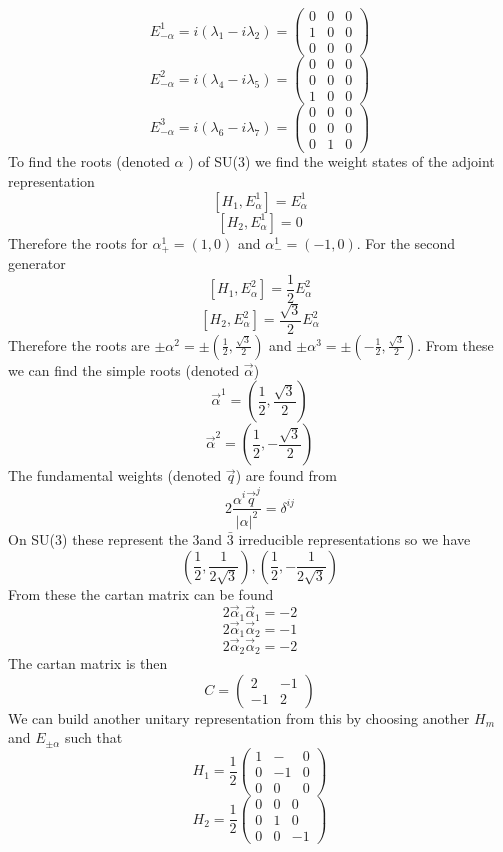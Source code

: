 \documentclass[12pt]{article}
\begin{document}
$$ E^1_{- \alpha} = i(\lambda_1 - i \lambda_2 ) = \begin{pmatrix}
  0&0&0 \\ 1&0&0 \\ 0&0&0 
\end{pmatrix} $$
$$ E^2_{- \alpha} = i(\lambda_4 - i \lambda_5 ) = \begin{pmatrix}
  0&0&0 \\ 0&0&0 \\ 1&0&0 
\end{pmatrix} $$
$$ E^3_{- \alpha} = i(\lambda_6 - i \lambda_7 ) = \begin{pmatrix}
  0&0&0 \\ 0&0&0 \\ 0&1&0 
\end{pmatrix} $$
To find the roots (denoted $\alpha$ ) of SU(3) we find the weight states of the adjoint representation 
$$ [ H_1, E^1_{\alpha} ] = E^1_{\alpha} $$
$$ [H_2, E^1_{\alpha}] = 0 $$
Therefore the roots for $\alpha^1_+ = (1,0)$ and $\alpha_-^1 = (-1,0) $. For the second generator 
$$ [H_1, E_{\alpha}^2] = \frac{1}{2} E^2_{\alpha} $$
$$ [H_2, E_{\alpha}^2 ] = \frac{\sqrt{3}}{2} E^2_{\alpha} $$
Therefore the roots are $\pm \alpha^2 = \pm (\frac{1}{2}, \frac{\sqrt{3}}{2} ) $ and $\pm \alpha^3 = \pm (- \frac{1}{2}, \frac{\sqrt{3}}{2})$. From these we can find the simple roots (denoted $\vec{\alpha}$) 
$$ \vec{\alpha}^1 = (\frac{1}{2}, \frac{\sqrt{3}}{2} ) $$
$$ \vec{\alpha}^2 = (\frac{1}{2}, - \frac{\sqrt{3}}{2} ) $$
The fundamental weights (denoted $\vec{q}$) are found from 
$$ 2 \frac{\alpha^i \vec{q}^j}{|\alpha|^2} = \delta^{ij}  $$
On SU(3) these represent the $3$and $\bar{3}$ irreducible representations so we have 
$$ (\frac{1}{2}, \frac{1}{2 \sqrt{3}} ), (\frac{1}{2}, - \frac{1}{2 \sqrt{3}} ) $$
From these the cartan matrix can be found 
$$ 2 \vec{\alpha}_1 \vec{\alpha}_1 = -2 $$
$$ 2 \vec{\alpha}_1 \vec{\alpha}_2 = -1 $$
$$ 2 \vec{\alpha}_2 \vec{\alpha}_2 = -2 $$
The cartan matrix is then 
$$ C = \begin{pmatrix}
  2 & -1 \\ -1 & 2 
\end{pmatrix} $$
We can build another unitary representation from this by choosing another $H_m$ and $E_{\pm \alpha}$ such that 
$$ H_1 = \frac{1}{2} \begin{pmatrix}
  1&-&0 \\ 0&-1&0\\0&0&0
\end{pmatrix} $$
$$ H_2 = \frac{1}{2} \begin{pmatrix}
  0&0&0 \\ 0&1&0 \\ 0&0&-1
\end{pmatrix} $$
\end{document}
